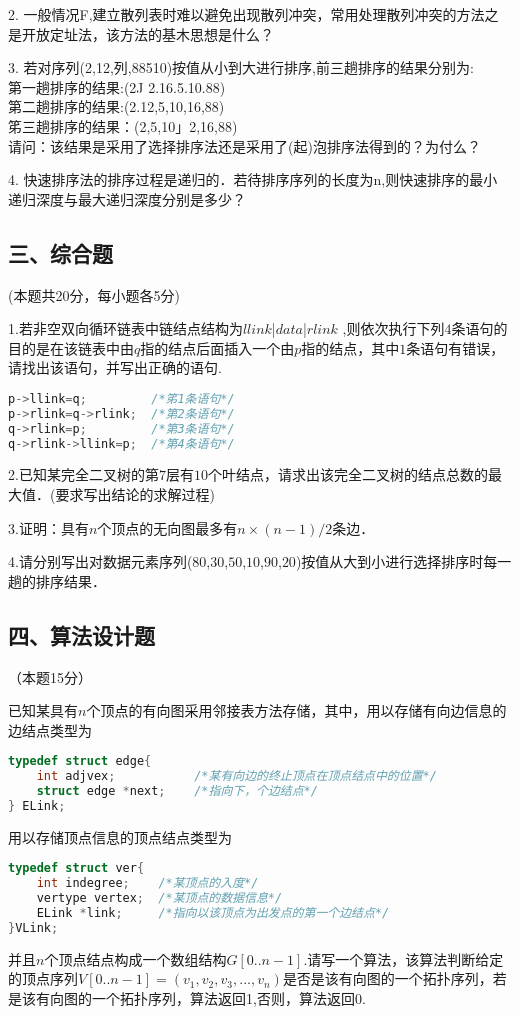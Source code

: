 2. 一般情况F,建立散列表时难以避免出现散列冲突，常用处理散列冲突的方法之 是开放定址法，该方法的基木思想是什么？

3. 若对序列(2,12,列,88510)按值从小到大进行排序,前三趟排序的结果分别为: \\
第一趟排序的结果:(2J 2.16.5.10.88) \\
第二趟排序的结果:(2.12,5,10,16,88) \\
笫三趟排序的结果：(2,5,10」2,16,88) \\
请问：该结果是采用了选择排序法还是采用了(起)泡排序法得到的？为付么？

4. 快速排序法的排序过程是递归的．若待排序序列的长度为n,则快速排序的最小 递归深度与最大递归深度分别是多少？

\subsection{三、综合题}
(本题共20分，每小题各5分)

1.若非空双向循环链表中链结点结构为$llink$|$data$|$rlink$ ,则依次执行下列$4$条语句的目的是在该链表中由$q$指的结点后面插入一个由$p$指的结点，其中$1$条语句有错误，请找出该语句，并写出正确的语句.
\begin{lstlisting}[language=cpp]
p->llink=q;         /*笫1条语句*/
p->rlink=q->rlink;  /*第2条语句*/
q->rlink=p;         /*第3条语句*/
q->rlink->llink=p;  /*第4条语句*/
\end{lstlisting}

2.已知某完全二叉树的第$7$层有$10$个叶结点，请求出该完全二叉树的结点总数的最大值．(要求写出结论的求解过程)

3.证明：具有$n$个顶点的无向图最多有$n\times(n-1)/2$条边．

4.请分别写出对数据元素序列($80$,$30$,$50$,$10$,$90$,$20$)按值从大到小进行选择排序时每一趟的排序结果．

\subsection{四、算法设计题}
（本题15分）

已知某具有$n$个顶点的有向图采用邻接表方法存储，其中，用以存储有向边信息的边结点类型为
\begin{lstlisting}[language=cpp]
typedef struct edge{
    int adjvex;           /*某有向边的终止顶点在顶点结点中的位置*/
    struct edge *next;    /*指向下，个边结点*/
} ELink;
\end{lstlisting}
用以存储顶点信息的顶点结点类型为
\begin{lstlisting}[language=cpp]
typedef struct ver{
    int indegree;    /*某顶点的入度*/
    vertype vertex;  /*某顶点的数据信息*/
    ELink *link;     /*指向以该顶点为出发点的第一个边结点*/
}VLink;
\end{lstlisting}
并且$n$个顶点结点构成一个数组结构$G[0..n-1]$.请写一个算法，该算法判断给定的顶点序列$V[0..n-1]=(v_1,v_2,v_3,...,v_n)$是否是该有向图的一个拓扑序列，若是该有向图的一个拓扑序列，算法返回1,否则，算法返回0.

